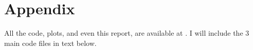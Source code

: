 \appendix
\section{Appendix}

All the code, plots, and even this report, are available at \cite{mygithub}. I will include the 3 main code files in text below.





